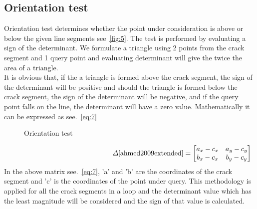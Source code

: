 \documentclass[fleqn, 12.5pt,a4paper]{report}
\begin{document}
\subsection{Orientation test}
Orientation test determines whether the point under consideration is above or below the given line segments see~\autoref{fig:5}. The test is performed by evaluating a sign of the determinant. We formulate a triangle using 2 points from the crack segment and 1 query point and evaluating determinant will give the twice the area of a triangle. \\
It is obvious that, if the a triangle is formed above the crack segment, the sign of the determinant will be positive and should the triangle is formed below the crack segment, the sign of the determinant will be negative, and if the query point falls on the line, the determinant will have a zero value. Mathematically it can be expressed as see.~\autoref{eq:7}

\begin{figure}[h]%
    \centering
    \hspace{1.5cm}
    \caption{Orientation test}\cite{ahmed2009extended}%
    \label{fig:5}
\end{figure}
\vspace{-0.25cm}
\begin{align}\label{eq:7}
\hspace{5.25cm}\Delta \cite{ahmed2009extended} =  
\begin{bmatrix}
a_x - c_x & a_y - c_y\\
b_x - c_x & b_y - c_y\\
\end{bmatrix}
\end{align}
In the above matrix see.~\autoref{eq:7}, 'a' and 'b' are the coordinates of the crack segment and 'c' is the coordinates of the point under query.
This methodology is applied for all the crack segments in a loop and the determinant value which has the least magnitude will be considered and the sign of that value is calculated.
\vsapce{-0.1cm}
\end{document}
